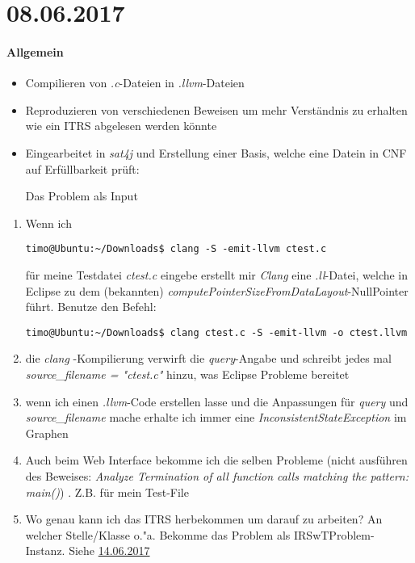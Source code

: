 \section*{08.06.2017}

\paragraph{Allgemein}
\begin{itemize}
	\item Compilieren von \emph{.c}-Dateien in \emph{.llvm}-Dateien
	\item Reproduzieren von verschiedenen Beweisen um mehr Verständnis zu erhalten wie ein ITRS abgelesen werden könnte
	\item Eingearbeitet in \emph{sat4j} und Erstellung einer Basis, welche eine Datein in CNF auf Erfüllbarkeit prüft: 
	
	Das Problem als Input
	
	
	
\end{itemize}

\begin{enumerate}
	\item Wenn ich 
		\lstset{autogobble=true}
		\begin{lstlisting}[style=BASH]
			timo@Ubuntu:~/Downloads$ clang -S -emit-llvm ctest.c
		\end{lstlisting}
		für meine Testdatei \emph{ctest.c} eingebe erstellt mir \emph{Clang} eine \emph{.ll}-Datei, welche in Eclipse zu dem (bekannten) \emph{computePointerSizeFromDataLayout}-NullPointer führt. \newline
		\answer Benutze den Befehl: 
		\begin{lstlisting}[style=BASH]
			timo@Ubuntu:~/Downloads$ clang ctest.c -S -emit-llvm -o ctest.llvm
		\end{lstlisting}
	\item die \emph{clang} -Kompilierung verwirft die \emph{query}-Angabe und schreibt jedes mal \emph{source\_filename = "ctest.c"} hinzu, was Eclipse Probleme bereitet
	\item wenn ich einen \emph{.llvm}-Code erstellen lasse und die Anpassungen für \emph{query} und \emph{source\_filename} mache erhalte ich immer eine \emph{InconsistentStateException} im Graphen 
	\item Auch beim Web Interface bekomme ich die selben Probleme (nicht ausführen des Beweises: \emph{Analyze Termination of all function calls matching the pattern: main()}) . Z.B. für mein Test-File
	\newpage
		\lstset{escapechar=@, style=customc,xleftmargin=.2\textwidth, xrightmargin=.2\textwidth, autogobble=true}
			
	\item Wo genau kann ich das ITRS herbekommen um darauf zu arbeiten? An welcher Stelle/Klasse o."a. \answer Bekomme das Problem als IRSwTProblem-Instanz. Siehe \hyperref[IRSwTProblemMethoden]{14.06.2017}
\end{enumerate}

